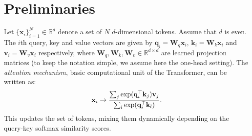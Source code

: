 \section{Preliminaries}
\label{sec:preliminaries}
Let $\{ \mathbf{x}_i \}_{i=1}^N \in \mathbb{R}^d$ denote a set of $N$ $d$-dimensional tokens.
Assume that $d$ is even.
The $i$th query, key and value vectors are given by $\mathbf{q}_i = \mathbf{W}_q \mathbf{x}_i$, $\mathbf{k}_i = \mathbf{W}_k \mathbf{x}_i$ and $\mathbf{v}_i = \mathbf{W}_v \mathbf{x}_i$ respectively, where $\mathbf{W}_q, \mathbf{W}_k, \mathbf{W}_v \in \mathbb{R}^{d \times d}$ are learned projection matrices (to keep the notation simple, we assume here the one-head setting).
The \emph{attention mechanism}, basic computational unit of the Transformer, can be written as:
\vspace{-1.5mm}
\begin{equation}
    \mathbf{x}_i \rightarrow \frac{\sum_{j} \exp(\mathbf{q}_i^\top \mathbf{k}_j) \mathbf{v}_j }{\sum_l \exp(\mathbf{q}_i^\top \mathbf{k}_l)}.
\vspace{-1.5mm}
\end{equation}
This updates the set of tokens, mixing them dynamically depending on the query-key softmax similarity scores.

